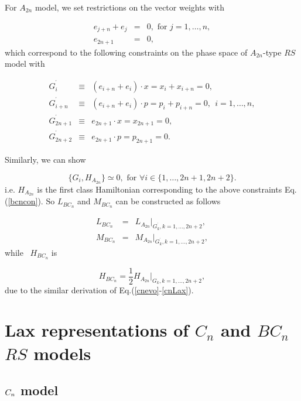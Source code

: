 \documentclass[a4paper,12pt]{article}
\newcommand{\sect}[1]{\setcounter{equation}{0}\section{#1}}
\begin{document}
\vspace{1pt}For $A_{2n}$ model, we set restrictions on the vector weights
with

\begin{eqnarray}
e_{j+n}+e_{j} &=&0,\mbox{\ \ \ for \ \ \ }j=1,\ldots ,n,  \nonumber \\
e_{2n+1} &=&0,
\end{eqnarray}
which correspond to the following constraints on the phase space of
$A_{2n}$-type $RS$ model with

\begin{eqnarray}
G_{i}^{^{\prime }} &\equiv &(e_{i+n}+e_{i})\cdot x=x_{i}+x_{i+n}=0,
\nonumber \\
G_{i+n}^{^{\prime }} &\equiv &(e_{i+n}+e_{i})\cdot p=p_{i}+p_{i+n}=0,\ \
i=1,\ldots ,n,	\nonumber \\
G_{2n+1}^{^{\prime }} &\equiv &e_{2n+1}\cdot x=x_{2n+1}=0,  \nonumber \\
G_{2n+2}^{^{\prime }} &\equiv &e_{2n+1}\cdot p=p_{2n+1}=0.  \label{bcncon}
\end{eqnarray}

\noindent Similarly, we can show

\begin{equation}
\{G_{i},H_{A_{2n}}\}\simeq 0,\mbox{\ \ \ for \ \ \ \ }\forall i\in
\{1,\ldots ,2n+1,2n+2\}.
\end{equation}
i.e. $H_{A_{2n}}$ is the first class Hamiltonian corresponding to the above
constraints Eq. (\ref{bcncon}). So $L_{BC_{n}}$ and $M_{BC_{n}}$ can be
constructed as follows

\begin{eqnarray}
L_{BC_{n}} &=&L_{A_{2n}}|_{G_{k}^{^{\prime }},k=1,...,2n+2},  \nonumber \\
M_{BC_{n}} &=&M_{A_{2n}}|_{G_{k}^{^{\prime }},k=1,...,2n+2},
\end{eqnarray}
while \ $H_{BC_{n}}$ is

\begin{equation}
H_{BC_{n}}=\frac{1}{2}H_{A_{2n}}|_{G_{k},k=1,...,2n+2},
\end{equation}
due to the similar derivation of Eq.(\ref{cnevo}-\ref{cnLax}).

\sect{ Lax representations of $C_{n} $ and $BC_{n}$ $RS$ models}
\label{lax}

\subsection{$\protect\vspace{1pt}C_{n}$ model}
\end{document}

